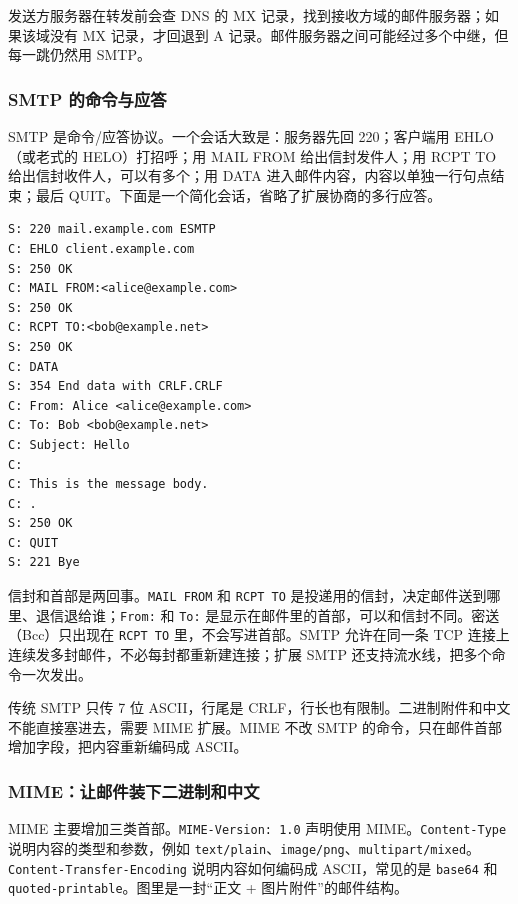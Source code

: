 发送方服务器在转发前会查 DNS 的 MX 记录，找到接收方域的邮件服务器；如果该域没有 MX 记录，才回退到 A 记录。邮件服务器之间可能经过多个中继，但每一跳仍然用 SMTP。

\subsubsection{SMTP 的命令与应答}

SMTP 是命令/应答协议。一个会话大致是：服务器先回 220；客户端用 EHLO（或老式的 HELO）打招呼；用 MAIL FROM 给出信封发件人；用 RCPT TO 给出信封收件人，可以有多个；用 DATA 进入邮件内容，内容以单独一行句点结束；最后 QUIT。下面是一个简化会话，省略了扩展协商的多行应答。

\begin{lstlisting}
S: 220 mail.example.com ESMTP
C: EHLO client.example.com
S: 250 OK
C: MAIL FROM:<alice@example.com>
S: 250 OK
C: RCPT TO:<bob@example.net>
S: 250 OK
C: DATA
S: 354 End data with CRLF.CRLF
C: From: Alice <alice@example.com>
C: To: Bob <bob@example.net>
C: Subject: Hello
C:
C: This is the message body.
C: .
S: 250 OK
C: QUIT
S: 221 Bye
\end{lstlisting}

信封和首部是两回事。\texttt{MAIL FROM} 和 \texttt{RCPT TO} 是投递用的信封，决定邮件送到哪里、退信退给谁；\texttt{From:} 和 \texttt{To:} 是显示在邮件里的首部，可以和信封不同。密送（Bcc）只出现在 \texttt{RCPT TO} 里，不会写进首部。SMTP 允许在同一条 TCP 连接上连续发多封邮件，不必每封都重新建连接；扩展 SMTP 还支持流水线，把多个命令一次发出。

传统 SMTP 只传 7 位 ASCII，行尾是 CRLF，行长也有限制。二进制附件和中文不能直接塞进去，需要 MIME 扩展。MIME 不改 SMTP 的命令，只在邮件首部增加字段，把内容重新编码成 ASCII。

\subsubsection{MIME：让邮件装下二进制和中文}

MIME 主要增加三类首部。\texttt{MIME-Version: 1.0} 声明使用 MIME。\texttt{Content-Type} 说明内容的类型和参数，例如 \texttt{text/plain}、\texttt{image/png}、\texttt{multipart/mixed}。\texttt{Content-Transfer-}\allowbreak\texttt{Encoding} 说明内容如何编码成 ASCII，常见的是 \texttt{base64} 和 \texttt{quoted-printable}。图里是一封“正文 + 图片附件”的邮件结构。

